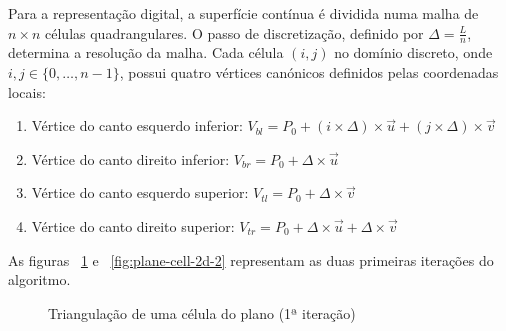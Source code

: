 \documentclass[11pt, a4paper, fleqn]{article}
\begin{document}
\noindent Para a representação digital, a superfície contínua é dividida numa malha de $n \times n$ células quadrangulares. O passo de discretização, definido por $\Delta = \frac{L}{n}$, determina a resolução da malha. Cada célula $(i, j)$ no domínio discreto, onde $i, j \in \{0, \dots, n-1\}$, possui quatro vértices canónicos definidos pelas coordenadas locais:
\begin{enumerate}
    \item Vértice do canto esquerdo inferior: $V_{bl} = P_0 + (i \times \Delta) \times \vec{u} + (j \times \Delta) \times \vec{v}$
    \item Vértice do canto direito inferior: $V_{br} = P_0 + \Delta \times \vec{u}$
    \item Vértice do canto esquerdo superior: $V_{tl} = P_0 + \Delta \times \vec{v}$
    \item Vértice do canto direito superior: $V_{tr} = P_0 + \Delta \times \vec{u} + \Delta \times \vec{v}$
\end{enumerate}

\noindent As figuras ~\ref{fig:plane-cell-2d-1} e ~\ref{fig:plane-cell-2d-2} representam as duas primeiras iterações do algoritmo.


\begin{figure}[H]
    \centering

    \caption{Triangulação de uma célula do plano (1ª iteração)}
    \label{fig:plane-cell-2d-1}
\end{figure}
\end{document}
